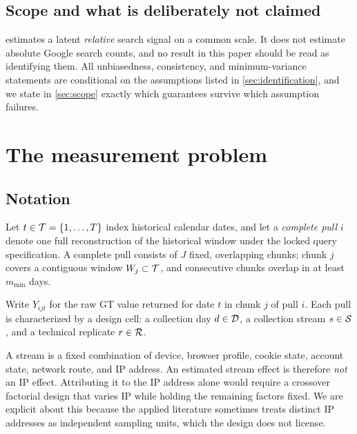 \documentclass[12pt,a4paper,oneside]{article}
\begin{document}
\subsection{Scope and what is deliberately not claimed}

\RACER{} estimates a latent \emph{relative} search signal on a common scale. It
does not estimate absolute Google search counts, and no result in this paper
should be read as identifying them. All unbiasedness, consistency, and
minimum-variance statements are conditional on the assumptions listed in
\cref{sec:identification}, and we state in \cref{sec:scope} exactly which
guarantees survive which assumption failures.

\section{The measurement problem}\label{sec:problem}

\subsection{Notation}

Let $t \in \mathcal{T} = \{1,\dots,T\}$ index historical calendar dates, and let a
\emph{complete pull} $i$ denote one full reconstruction of the historical
window under the locked query specification. A complete pull consists of $J$
fixed, overlapping chunks; chunk $j$ covers a contiguous window
$W_j \subset \mathcal{T}$, and consecutive chunks overlap in at least
$m_{\min}$ days.

Write $Y_{ijt}$ for the raw GT value returned for date $t$ in chunk $j$ of pull
$i$. Each pull is characterized by a design cell: a collection day
$d \in \mathcal{D}$, a collection stream $s \in \mathcal{S}$, and a technical replicate
$r \in \mathcal{R}$.

\begin{remark}
A stream is a fixed combination of device, browser profile, cookie state,
account state, network route, and IP address. An estimated stream effect is
therefore \emph{not} an IP effect. Attributing it to the IP address alone would
require a crossover factorial design that varies IP while holding the remaining
factors fixed. We are explicit about this because the applied literature
sometimes treats distinct IP addresses as independent sampling units, which the
design does not license.
\end{remark}
\end{document}
